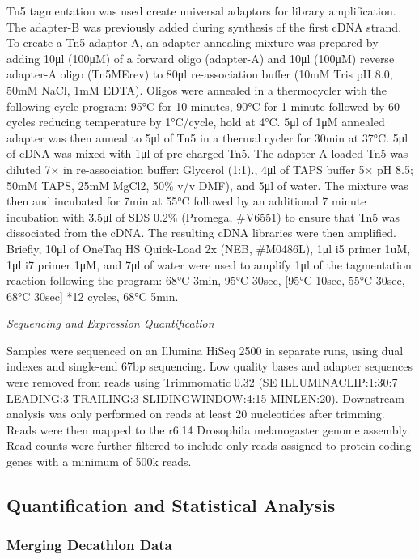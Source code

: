 \documentclass[12pt,letterpaper]{article}
\begin{document}
Tn5 tagmentation was used create universal adaptors for library amplification. The adapter-B was previously added during synthesis of the first cDNA strand. To create a Tn5 adaptor-A, an adapter annealing mixture was prepared by adding 10μl (100μM) of a forward oligo (adapter-A) and 10μl (100μM) reverse adapter-A oligo (Tn5MErev) to 80μl re-association buffer (10mM Tris pH 8.0, 50mM NaCl, 1mM EDTA). Oligos were annealed in a thermocycler with the following cycle program: 95°C for 10 minutes, 90°C for 1 minute followed by 60 cycles reducing temperature by 1°C/cycle, hold at 4°C. 5μl of 1μM annealed adapter was then anneal to 5μl of Tn5 in a thermal cycler for 30min at 37°C. 5μl of cDNA was mixed with 1μl of pre-charged Tn5. The adapter-A loaded Tn5 was diluted 7× in re-association buffer: Glycerol (1:1)., 4μl of TAPS buffer 5× pH 8.5; 50mM TAPS, 25mM MgCl2, 50\% v/v DMF), and 5μl of water. The mixture was then and incubated for 7min at 55°C followed by an additional 7 minute incubation with 3.5μl of SDS 0.2\% (Promega, #V6551) to ensure that Tn5 was dissociated from the cDNA. The resulting cDNA libraries were then amplified. Briefly, 10μl of OneTaq HS Quick-Load 2x (NEB, #M0486L), 1μl i5 primer 1uM, 1μl i7 primer 1μM, and 7μl of water were used to amplify 1μl of the tagmentation reaction following the program: 68°C 3min, 95°C 30sec, [95°C 10sec, 55°C 30sec, 68°C 30sec] *12 cycles, 68°C 5min.

\textit{Sequencing and Expression Quantification}

Samples were sequenced on an Illumina HiSeq 2500 in separate runs, using dual indexes and single-end 67bp sequencing. Low quality bases and adapter sequences were removed from reads using Trimmomatic 0.32 (SE ILLUMINACLIP:1:30:7 LEADING:3 TRAILING:3 SLIDINGWINDOW:4:15 MINLEN:20). Downstream analysis was only performed on reads at least 20 nucleotides after trimming. Reads were then mapped to the r6.14 Drosophila melanogaster genome assembly. Read counts were further filtered to include only reads assigned to protein coding genes with a minimum of 500k reads.

\subsection{Quantification and Statistical Analysis}

\subsubsection{Merging Decathlon Data}
\end{document}

